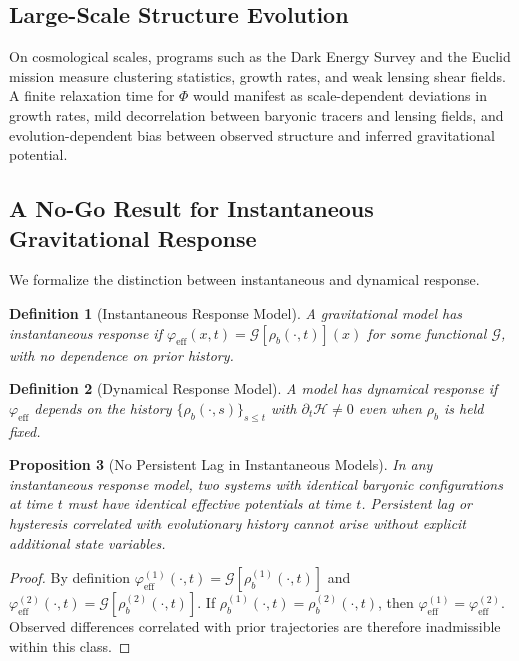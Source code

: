 \documentclass[11pt, a4paper, twocolumn]{article}
\newtheorem{definition}{Definition}[section]
\newtheorem{proposition}[definition]{Proposition}
\begin{document}
\subsection{Large-Scale Structure Evolution}

On cosmological scales, programs such as the Dark Energy Survey and the Euclid
mission measure clustering statistics, growth rates, and weak lensing shear
fields. A finite relaxation time for $\Phi$ would manifest as scale-dependent
deviations in growth rates, mild decorrelation between baryonic tracers and
lensing fields, and evolution-dependent bias between observed structure and
inferred gravitational potential.

\subsection{A No-Go Result for Instantaneous Gravitational Response}

We formalize the distinction between instantaneous and dynamical response.

\begin{definition}[Instantaneous Response Model]
A gravitational model has instantaneous response if $\varphi_{\mathrm{eff}}(x,t)
= \mathcal{G}[\rho_b(\cdot,t)](x)$ for some functional $\mathcal{G}$, with no
dependence on prior history.
\end{definition}

\begin{definition}[Dynamical Response Model]
A model has dynamical response if $\varphi_{\mathrm{eff}}$ depends on the
history $\{\rho_b(\cdot,s)\}_{s \leq t}$ with $\partial_t\mathcal{H} \neq 0$
even when $\rho_b$ is held fixed.
\end{definition}

\begin{proposition}[No Persistent Lag in Instantaneous Models]
In any instantaneous response model, two systems with identical baryonic
configurations at time $t$ must have identical effective potentials at time $t$.
Persistent lag or hysteresis correlated with evolutionary history cannot arise
without explicit additional state variables.
\end{proposition}

\begin{proof}
By definition $\varphi_{\mathrm{eff}}^{(1)}(\cdot,t) = \mathcal{G}[\rho_b^{(1)}
(\cdot,t)]$ and $\varphi_{\mathrm{eff}}^{(2)}(\cdot,t) = \mathcal{G}[\rho_b^{(2)}
(\cdot,t)]$. If $\rho_b^{(1)}(\cdot,t) = \rho_b^{(2)}(\cdot,t)$, then
$\varphi_{\mathrm{eff}}^{(1)} = \varphi_{\mathrm{eff}}^{(2)}$. Observed differences
correlated with prior trajectories are therefore inadmissible within this class.
\end{proof}
\end{document}
